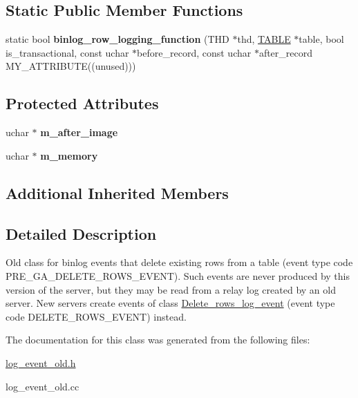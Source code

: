 \subsection*{Static Public Member Functions}
\begin{DoxyCompactItemize}
\item 
\mbox{\label{classDelete__rows__log__event__old_accd11a0bcdfd1293f87dfeb18364e358}} 
static bool {\bfseries binlog\+\_\+row\+\_\+logging\+\_\+function} (T\+HD $\ast$thd, \mbox{\hyperlink{structTABLE}{T\+A\+B\+LE}} $\ast$table, bool is\+\_\+transactional, const uchar $\ast$before\+\_\+record, const uchar $\ast$after\+\_\+record M\+Y\+\_\+\+A\+T\+T\+R\+I\+B\+U\+TE((unused)))
\end{DoxyCompactItemize}
\subsection*{Protected Attributes}
\begin{DoxyCompactItemize}
\item 
\mbox{\label{classDelete__rows__log__event__old_aaf0d6b6faba7094598e5d565b340dfd7}} 
uchar $\ast$ {\bfseries m\+\_\+after\+\_\+image}
\item 
\mbox{\label{classDelete__rows__log__event__old_a3fedb29a85d8b84e6cafc3a15c6818cf}} 
uchar $\ast$ {\bfseries m\+\_\+memory}
\end{DoxyCompactItemize}
\subsection*{Additional Inherited Members}


\subsection{Detailed Description}
Old class for binlog events that delete existing rows from a table (event type code P\+R\+E\+\_\+\+G\+A\+\_\+\+D\+E\+L\+E\+T\+E\+\_\+\+R\+O\+W\+S\+\_\+\+E\+V\+E\+NT). Such events are never produced by this version of the server, but they may be read from a relay log created by an old server. New servers create events of class \mbox{\hyperlink{classDelete__rows__log__event}{Delete\+\_\+rows\+\_\+log\+\_\+event}} (event type code D\+E\+L\+E\+T\+E\+\_\+\+R\+O\+W\+S\+\_\+\+E\+V\+E\+NT) instead. 

The documentation for this class was generated from the following files\+:\begin{DoxyCompactItemize}
\item 
\mbox{\hyperlink{log__event__old_8h}{log\+\_\+event\+\_\+old.\+h}}\item 
log\+\_\+event\+\_\+old.\+cc\end{DoxyCompactItemize}
